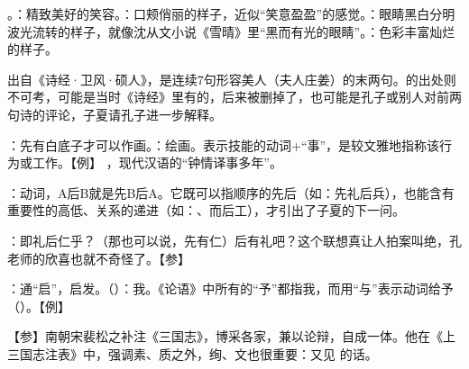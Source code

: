 {
\begin{lyitemize}
\item {}。：精致美好的笑容。：口颊俏丽的样子，近似“笑意盈盈”的感觉。：眼睛黑白分明波光流转的样子，就像沈从文小说《雪晴》里“黑而有光的眼睛”。：色彩丰富灿烂的样子。

出自《诗经·卫风·硕人》，是连续7句形容美人（夫人庄姜）的末两句。的出处则不可考，可能是当时《诗经》里有的，后来被删掉了，也可能是孔子或别人对前两句诗的评论，子夏请孔子进一步解释。
\item {}：先有白底子才可以作画。：绘画。表示技能的动词+“事”，是较文雅地指称该行为或工作。【例】 ，现代汉语的“钟情译事多年”。

：动词，A后B就是先B后A。它既可以指顺序的先后（如：先礼后兵），也能含有重要性的高低、关系的递进（如：、而后工），才引出了子夏的下一问。

\item {}：即礼后仁乎？（那也可以说，先有仁）后有礼吧？这个联想真让人拍案叫绝，孔老师的欣喜也就不奇怪了。【参】 
\item {}：通“启”，启发。（）：我。《论语》中所有的“予”都指我，而用“与”表示动词给予（）。【例】 
\end{lyitemize}
【参】南朝宋裴松之补注《三国志》，博采各家，兼以论辩，自成一体。他在《上三国志注表》中，强调素、质之外，绚、文也很重要：又见  的话。}
{}
%


